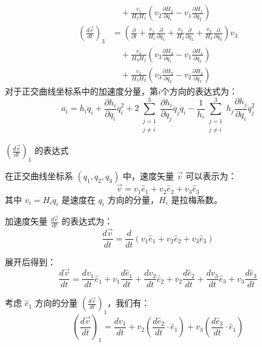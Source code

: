 \documentclass[12pt, a4paper, oneside, UTF8]{ctexbook}  %
\begin{document}
\begin{defn}
\begin{align*}
    \\&\quad+ \frac{v_1}{H_2 H_1}\left(v_2 \frac{\partial H_2}{\partial q_1} - v_1 \frac{\partial H_1}{\partial q_2}\right)
\end{align*}
\begin{align*}
    \left(\frac{d\vec{v}}{dt}\right)_3 &=
        \left(\frac{\partial}{\partial t} + \frac{v_1}{H_1}\frac{\partial}{\partial q_1}
        + \frac{v_2}{H_2}\frac{\partial}{\partial q_2} + \frac{v_3}{H_3}\frac{\partial}{\partial q_3}
    \right)v_3 \\&\quad+ \frac{v_1}{H_3 H_1}\left(v_3 \frac{\partial H_3}{\partial q_1} - v_1 \frac{\partial H_1}{\partial q_3}\right)
    \\&\quad+ \frac{v_2}{H_3 H_2}\left(v_3 \frac{\partial H_3}{\partial q_2} - v_2 \frac{\partial H_2}{\partial q_3}\right)
\end{align*}
    对于正交曲线坐标系中的加速度分量，第\( i \)个方向的表达式为：
    \[
    a_i = h_i \ddot{q}_i + \frac{\partial h_i}{\partial q_i} \dot{q}_i^2 + 2 \sum_{\substack{j=1 \\ j \neq i}}^3 \frac{\partial h_i}{\partial q_j} \dot{q}_j \dot{q}_i - \frac{1}{h_i} \sum_{\substack{j=1 \\ j \neq i}}^3 h_j \frac{\partial h_j}{\partial q_i} \dot{q}_j^2
    \]
\begin{tui}
\(\left(\frac{d\vec{v}}{dt}\right)_1\) 的表达式

在正交曲线坐标系 \( (q_1, q_2, q_3) \) 中，速度矢量 \(\vec{v}\) 可以表示为：
\[
\vec{v} = v_1 \hat{e}_1 + v_2 \hat{e}_2 + v_3 \hat{e}_3
\]
其中 \( v_i = H_i \dot{q}_i \) 是速度在 \( q_i \) 方向的分量，\( H_i \) 是拉梅系数。

加速度矢量 \(\frac{d\vec{v}}{dt}\) 的表达式为：
\[
\frac{d\vec{v}}{dt} = \frac{d}{dt}(v_1 \hat{e}_1 + v_2 \hat{e}_2 + v_3 \hat{e}_3)
\]

展开后得到：
\[
\frac{d\vec{v}}{dt} = \frac{dv_1}{dt} \hat{e}_1 + v_1 \frac{d\hat{e}_1}{dt} + \frac{dv_2}{dt} \hat{e}_2 + v_2 \frac{d\hat{e}_2}{dt} + \frac{dv_3}{dt} \hat{e}_3 + v_3 \frac{d\hat{e}_3}{dt}
\]

考虑 \( \hat{e}_1 \) 方向的分量 \(\left(\frac{d\vec{v}}{dt}\right)_1\)，我们有：
\[
\left(\frac{d\vec{v}}{dt}\right)_1 = \frac{dv_1}{dt} + v_2 \left(\frac{d\hat{e}_2}{dt} \cdot \hat{e}_1\right) + v_3 \left(\frac{d\hat{e}_3}{dt} \cdot \hat{e}_1\right)
\]


\end{tui}
\end{defn}
\end{document}
